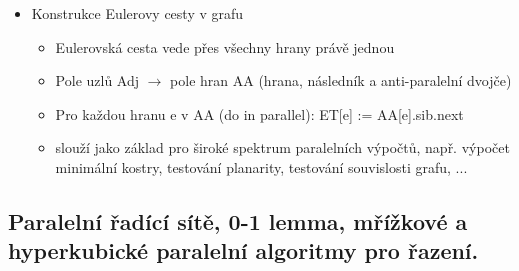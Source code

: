\documentclass[a4paper,hidelinks]{article}
\begin{document}
\begin{itemize}
\begin{itemize}
    \end{itemize}
    \item Konstrukce Eulerovy cesty v grafu
    \begin{itemize}
        \item Eulerovská cesta vede přes všechny hrany právě jednou
        \item Pole uzlů Adj $\to$ pole hran AA (hrana, následník a anti-paralelní dvojče)
        \item Pro každou hranu e v AA (do in parallel): ET[e] := AA[e].sib.next
        \item slouží jako základ pro široké spektrum paralelních výpočtů, např. výpočet minimální kostry, testování planarity, testování souvislosti grafu, ...
    \end{itemize}
\end{itemize}

\subsection{Paralelní řadící sítě, 0-1 lemma, mřížkové a hyperkubické paralelní algoritmy pro řazení.}
\end{document}
